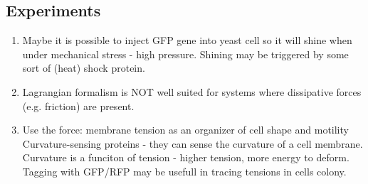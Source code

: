 \documentclass[10pt,a4paper]{article}
\begin{document}
\subsection{Experiments}
\begin{enumerate}
 \item Maybe it is possible to inject GFP gene into yeast cell so it will shine when under mechanical stress - high pressure. 
 Shining may be triggered by some sort of (heat) shock protein.
 \item Lagrangian formalism is NOT well suited for systems where dissipative forces (e.g. friction) are present.
 \item Use the force: membrane tension as an organizer of cell shape and motility \cite{weiner:12} 
 Curvature-sensing proteins - they can sense the curvature of a cell membrane. 
 Curvature is a funciton of tension - higher tension, more energy to deform. Tagging with GFP/RFP may be usefull in tracing tensions in cells colony.
\end{enumerate}

 
\end{document}
